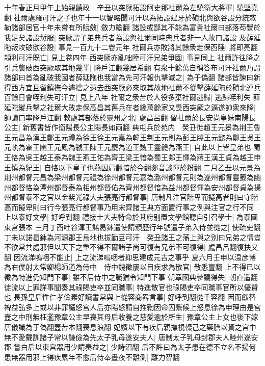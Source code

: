 十年春正月甲午上始親聽政　辛丑以突厥拓設阿史那社爾為左驍衛大將軍|{
	驍堅堯翻}
社爾處羅可汗之子也年十一以智略聞可汗以為拓設建牙於磧北與欲谷設分統敕勒諸部居官十年未嘗有所賦斂|{
	斂力贍翻}
諸設或鄙其不能為富貴社爾曰部落苟豐於我足矣諸設慙服|{
	突厥謂子弟典兵者為設與社爾同時典兵者非一人故曰諸設}
及薛延陁叛攻破欲谷設|{
	事見一百九十二卷元年}
社爾兵亦敗將其餘衆走保西陲|{
	將即亮翻}
頡利可汗既亡|{
	見上卷四年}
西突厥亦亂咄陸可汗兄弟爭國|{
	事見同上}
社爾詐往降之引兵襲破西突厥取其地幾半|{
	降戶江翻幾居希翻}
有衆十餘萬自稱答布可汗社爾乃謂諸部曰首為亂破我國者薛延陁也我當為先可汗報仇擊滅之|{
	為于偽翻}
諸部皆諫曰新得西方宜且留鎮撫今遽捨之遠去西突厥必來取其故地社爾不從擊薛延陁於磧北連兵百餘日會咥利失可汗立|{
	見上八年}
社爾之衆苦於人役多棄社爾逃歸|{
	逃歸咥利失}
薛延陀縱兵擊之社爾大敗走保高昌其舊兵在者纔萬餘家又畏西突厥之逼遂帥衆來降|{
	帥讀曰率降戶江翻}
敕處其部落於靈州之北|{
	處昌呂翻}
留社爾於長安尚皇妹南陽長公主|{
	新舊書皆作衡陽長公主陽長如兩翻}
典屯兵於苑内　癸丑徙趙王元景為荆王魯王元昌為漢王鄭王元禮為徐王徐王元嘉為韓王荆王元則為彭王滕王元懿為鄭王吳王元軌為霍王豳王元鳳為虢王陳王元慶為道王魏王靈虁為燕王|{
	自此以上皆皇弟也}
蜀王恪為吳王越王泰為魏王燕王佑為齊王梁王愔為蜀王郯王惲為蔣王漢王貞為越王申王慎為紀王|{
	自恪以下皇子也燕因肩翻愔於今翻郯音談惲於粉翻}
二月乙丑以元景為荆州都督元昌為梁州都督元禮為徐州都督元嘉為潞州都督元則為遂州都督靈蘷為幽州都督恪為潭州都督泰為相州都督佑為齊州都督愔為益州都督惲為安州都督貞為揚州都督泰不之官以金紫光祿大夫張亮行都督事|{
	唐制凡注官階卑而擬高者則曰守階高而擬卑則曰行今張亮行都督事乃用宋齊諸王典方面置行事之例與注官之行不同}
上以泰好文學|{
	好呼到翻}
禮接士大夫特命於其府别置文學館聽自引召學士|{
	為泰圖東宫張本}
三月丁酉吐谷渾王諾曷鉢遣使請頒歷行年號遣子弟入侍並從之|{
	使疏吏翻}
丁未以諾曷鉢為河源郡王烏地也拔勤豆可汗　癸丑諸王之藩上與之别曰兄弟之情豈不欲常共處邪但以天下之重不得不爾諸子尚可復有兄弟不可復得|{
	處昌呂翻復扶又翻}
因流涕嗚咽不能止|{
	上之流涕嗚咽者抑思建成元吉之事乎}
夏六月壬申以温彦博為右僕射太常卿楊師道為侍中　侍中魏徵屢以目疾求為散官|{
	散悉亶翻}
上不得已以徵為特進仍知門下事|{
	雖不居侍中之職猶令知門下事}
朝章國典參議得失|{
	朝直遥翻}
徒流以上罪詳事聞奏其祿賜吏卒並同職事|{
	特進散官也祿賜吏卒同職事官所以優賢也}
長孫皇后性仁孝儉素好讀書常與上從容商畧言事|{
	好呼到翻從千容翻}
因而獻替裨益弘多上或以非罪譴怒宫人后亦陽怒請自推鞫因命囚繫候上怒息徐為申理由是宫壼之中刑無枉濫豫章公主早喪其母后收養之慈愛逾於所生|{
	豫章公主上女也後下嫁唐儀識為于偽翻壼苦本翻喪息浪翻}
妃嬪以下有疾后親撫視輟己之藥膳以資之宫中無不愛戴訓諸子常以謙儉為先太子乳母遂安夫人|{
	唐制太子乳母封郡夫人睦州遂安郡}
嘗白后以東宫器用少請奏益之|{
	少詩沼翻}
后不許曰為太子患在德不立名不揚何患無器用邪上得疾累年不愈后侍奉晝夜不離側|{
	離力智翻}
